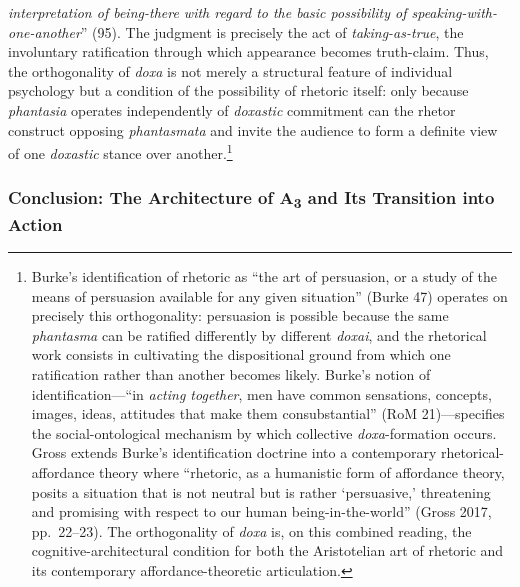 \textit{interpretation of being-there with regard to the basic possibility of speaking-with-one-another}'' (95). The judgment is precisely the act of \textit{taking-as-true}, the involuntary ratification through which appearance becomes truth-claim. Thus, the orthogonality of \textit{doxa} is not merely a structural feature of individual psychology but a condition of the possibility of rhetoric itself: only because \textit{phantasia} operates independently of \textit{doxastic} commitment can the rhetor construct opposing \textit{phantasmata} and invite the audience to form a definite view of one \textit{doxastic} stance over another.\footnote{Burke's identification of rhetoric as ``the art of persuasion, or a study of the means of persuasion available for any given situation'' (Burke 47) operates on precisely this orthogonality: persuasion is possible because the same \textit{phantasma} can be ratified differently by different \textit{doxai}, and the rhetorical work consists in cultivating the dispositional ground from which one ratification rather than another becomes likely. Burke's notion of identification---``in \textit{acting together}, men have common sensations, concepts, images, ideas, attitudes that make them consubstantial'' (RoM 21)---specifies the social-ontological mechanism by which collective \textit{doxa}-formation occurs. Gross extends Burke's identification doctrine into a contemporary rhetorical-affordance theory where ``rhetoric, as a humanistic form of affordance theory, posits a situation that is not neutral but is rather `persuasive,' threatening and promising with respect to our human being-in-the-world'' (Gross 2017, pp.~22--23). The orthogonality of \textit{doxa} is, on this combined reading, the cognitive-architectural condition for both the Aristotelian art of rhetoric and its contemporary affordance-theoretic articulation.}

\subsubsection*{Conclusion: The Architecture of A\textsubscript{3} and Its Transition into Action}

